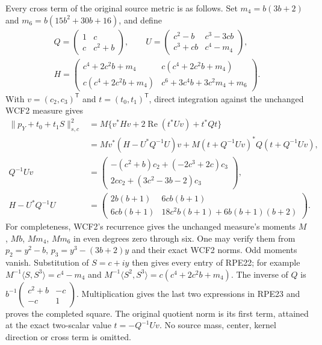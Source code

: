 \documentclass[11pt]{article}
\begin{document}
Every cross term of the original source metric is as follows. Set
$m_4=b(3b+2)$ and $m_6=b(15b^2+30b+16)$, and define
\[
 \begin{gathered}
 Q=\begin{pmatrix}1&c\\c&c^2+b\end{pmatrix},\qquad
 U=\begin{pmatrix}
 c^2-b&c^3-3cb\\c^3+cb&c^4-m_4
 \end{pmatrix},\\
 H=\begin{pmatrix}
 c^4+2c^2b+m_4&c(c^4+2c^2b+m_4)\\
 c(c^4+2c^2b+m_4)&c^6+3c^4b+3c^2m_4+m_6
 \end{pmatrix}.
 \end{gathered}\tag{RPE22}
\]
With $v=(c_2,c_3)^{\mathsf T}$ and $t=(t_0,t_1)^{\mathsf T}$,
direct integration against the unchanged WCF2 measure gives
\[
 \begin{split}
 \|p_Y+t_0+t_1S\|_{s,c}^2
 &=M\{v^*Hv+2\operatorname{Re}(t^*Uv)+t^*Qt\}\\
 &=M v^*(H-U^*Q^{-1}U)v
       +M(t+Q^{-1}Uv)^*Q(t+Q^{-1}Uv),\\
 Q^{-1}Uv
 &=\begin{pmatrix}
 -(c^2+b)c_2+(-2c^3+2c)c_3\\
 2cc_2+(3c^2-3b-2)c_3
 \end{pmatrix},\\
 H-U^*Q^{-1}U
 &=\begin{pmatrix}
 2b(b+1)&6cb(b+1)\\
 6cb(b+1)&18c^2b(b+1)+6b(b+1)(b+2)
 \end{pmatrix}.
 \end{split}\tag{RPE23}
\]
For completeness, WCF2's recurrence gives the unchanged measure's
moments $M$, $Mb$, $Mm_4$, $Mm_6$ in even degrees zero through six.
One may verify them from
$p_2=y^2-b$, $p_3=y^3-(3b+2)y$ and their exact WCF2 norms.
Odd moments vanish. Substitution of $S=c+iy$ then gives every
entry of RPE22; for example
$M^{-1}\langle S,S^3\rangle=c^4-m_4$ and
$M^{-1}\langle S^2,S^3\rangle=c(c^4+2c^2b+m_4)$.
The inverse of $Q$ is
$b^{-1}\left(\begin{smallmatrix}c^2+b&-c\\-c&1\end{smallmatrix}\right)$.
Multiplication gives the last two expressions in RPE23 and proves
the completed square. The original quotient norm is its first term,
attained at the exact two-scalar value $t=-Q^{-1}Uv$.
No source mass, center, kernel direction or cross term is omitted.
\end{document}

